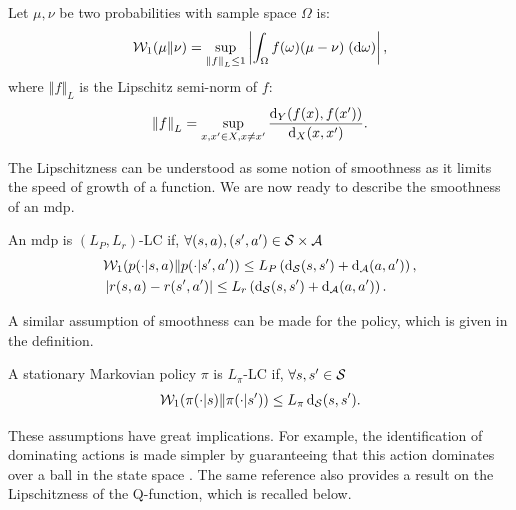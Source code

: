 \begin{defi}
    Let $\mu,\nu$ be two probabilities with sample space $\Omega$ is:
    \begin{align*}
        \wassersteindistance[1](\mu\Vert \nu)=\sup_{\left\Vert f\right\Vert_L\leq 1} \left\vert \int_{\Omega} f(\omega)(\mu-\nu)\; (\de \omega) \right\vert,
    \end{align*}
    where $\left\Vert f\right\Vert_L$ is the Lipschitz semi-norm of $f$:
    \begin{align*}
        \left\Vert f\right\Vert_L=\sup_{x,x'\in X, x\neq x'} \frac{\distance_Y(f(x),f(x'))}{\distance_X(x,x')}.
    \end{align*}
\end{defi}

The Lipschitzness can be understood as some notion of smoothness as it limits the speed of growth of a function.
We are now ready to describe the smoothness of an \gls{mdp}.

\begin{defi}
\label{def:lip_mdp}
An \gls{mdp} is $(L_P,L_r)$-LC if, $\forall(s,a),(s',a')\in\statespace\times\actionspace$
\begin{align*}
    & \wassersteindistance[1](\transitionfunction(\cdot\vert s,a)\Vert \transitionfunction(\cdot\vert s',a'))\leq L_P \left( \distance_{\statespace}(s,s')  + \distance_{\actionspace}(a,a')\right),
    \\
    & \left\vert r(s,a)-r(s',a') \right\vert \leq L_r \left( \distance_{\statespace}(s,s') + \distance_{\actionspace}(a,a')\right).
\end{align*}
\end{defi}

A similar assumption of smoothness can be made for the policy, which is given in the definition.

\begin{defi}
\label{def:lip_policy}
A stationary Markovian policy $\pi$ is $L_\pi$-LC if, $\forall s,s'\in\statespace$ 
\begin{align*}
    \wassersteindistance[1](\pi(\cdot\vert s)\Vert \pi(\cdot\vert s'))\leq L_\pi \distance_{\statespace}(s,s').
\end{align*}
\end{defi}


These assumptions have great implications. 
For example, the identification of dominating actions is made simpler by guaranteeing that this action dominates over a ball in the state space \cite{rachelson2010locality}. 
The same reference also provides a result on the Lipschitzness of the Q-function, which is recalled below.

